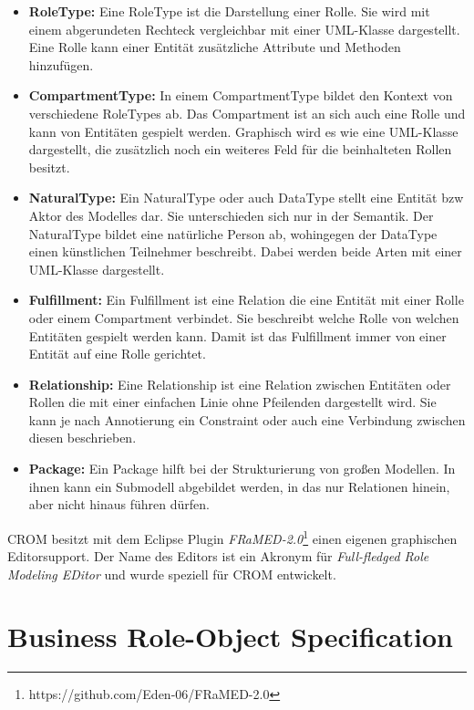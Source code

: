 \begin{itemize}
    \item \textbf{RoleType:}
    Eine RoleType ist die Darstellung einer Rolle.
    Sie wird mit einem abgerundeten Rechteck vergleichbar mit einer UML-Klasse dargestellt.
    Eine Rolle kann einer Entität zusätzliche Attribute und Methoden hinzufügen.
    \item \textbf{CompartmentType:}
    In einem CompartmentType bildet den Kontext von verschiedene RoleTypes ab.
    Das Compartment ist an sich auch eine Rolle und kann von Entitäten gespielt werden.
    Graphisch wird es wie eine UML-Klasse dargestellt, die zusätzlich noch ein weiteres Feld für die beinhalteten Rollen besitzt.
    \item \textbf{NaturalType:}
    Ein NaturalType oder auch DataType stellt eine Entität bzw Aktor des Modelles dar.
    Sie unterschieden sich nur in der Semantik.
    Der NaturalType bildet eine natürliche Person ab, wohingegen der DataType einen künstlichen Teilnehmer beschreibt.
    Dabei werden beide Arten mit einer UML-Klasse dargestellt. 
    \item \textbf{Fulfillment:}
    Ein Fulfillment ist eine Relation die eine Entität mit einer Rolle oder einem Compartment verbindet.
    Sie beschreibt welche Rolle von welchen Entitäten gespielt werden kann.
    Damit ist das Fulfillment immer von einer Entität auf eine Rolle gerichtet.
    \item \textbf{Relationship:}
    Eine Relationship ist eine Relation zwischen Entitäten oder Rollen die mit einer einfachen Linie ohne Pfeilenden dargestellt wird.
    Sie kann je nach Annotierung ein Constraint oder auch eine Verbindung zwischen diesen beschrieben.
    \item \textbf{Package:}
    Ein Package hilft bei der Strukturierung von großen Modellen.
    In ihnen kann ein Submodell abgebildet werden, in das nur Relationen hinein, aber nicht hinaus führen dürfen.
\end{itemize}

CROM besitzt mit dem Eclipse Plugin \emph{FRaMED-2.0}\footnote{https://github.com/Eden-06/FRaMED-2.0} einen eigenen graphischen Editorsupport.
Der Name des Editors ist ein Akronym für \emph{Full-fledged Role Modeling EDitor} und wurde speziell für CROM entwickelt.

\section{Business Role-Object Specification}

